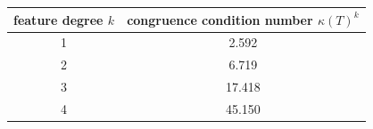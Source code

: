 \begin{tabular}{cc}
\toprule
feature degree $k$ & congruence condition number $\kappa(T)^k$ \\
\midrule
  1 & 2.592 \\
  2 & 6.719 \\
  3 & 17.418 \\
  4 & 45.150 \\
\bottomrule
\end{tabular}
